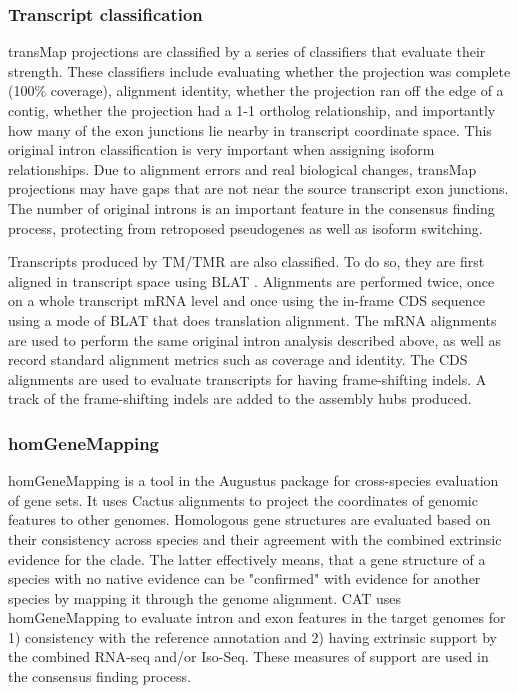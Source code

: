 \documentclass[fleqn,10pt]{wlscirep}
\begin{document}
\subsubsection*{Transcript classification}
	transMap projections are classified by a series of classifiers that evaluate their strength. These classifiers include evaluating whether the projection was complete (100\% coverage), alignment identity, whether the projection ran off the edge of a contig, whether the projection had a 1-1 ortholog relationship, and importantly how many of the exon junctions lie nearby in transcript coordinate space. This original intron classification is very important when assigning isoform relationships. Due to alignment errors and real biological changes, transMap projections may have gaps that are not near the source transcript exon junctions. The number of original introns is an important feature in the consensus finding process, protecting from retroposed pseudogenes as well as isoform switching.
  
	Transcripts produced by TM/TMR are also classified. To do so, they are first aligned in transcript space using BLAT  \citep{kent2002blat}. Alignments are performed twice, once on a whole transcript mRNA level and once using the in-frame CDS sequence using a mode of BLAT that does translation alignment. The mRNA alignments are used to perform the same original intron analysis described above, as well as record standard alignment metrics such as coverage and identity. The CDS alignments are used to evaluate transcripts for having frame-shifting indels. A track of the frame-shifting indels are added to the assembly hubs produced.

\subsubsection*{homGeneMapping}
	homGeneMapping is a tool in the Augustus package for cross-species evaluation of gene sets. It uses Cactus alignments to project the coordinates of genomic features to other genomes. Homologous gene structures are evaluated based on their consistency across species and their agreement with the combined extrinsic evidence for the clade. The latter effectively means, that a gene structure of a species with no native evidence can be "confirmed" with evidence for another species by mapping it through the genome alignment. CAT uses homGeneMapping to evaluate intron and exon features in the target genomes for 1) consistency with the reference annotation and 2) having extrinsic support by the combined RNA-seq and/or Iso-Seq. These measures of support are used in the consensus finding process.
\end{document}
